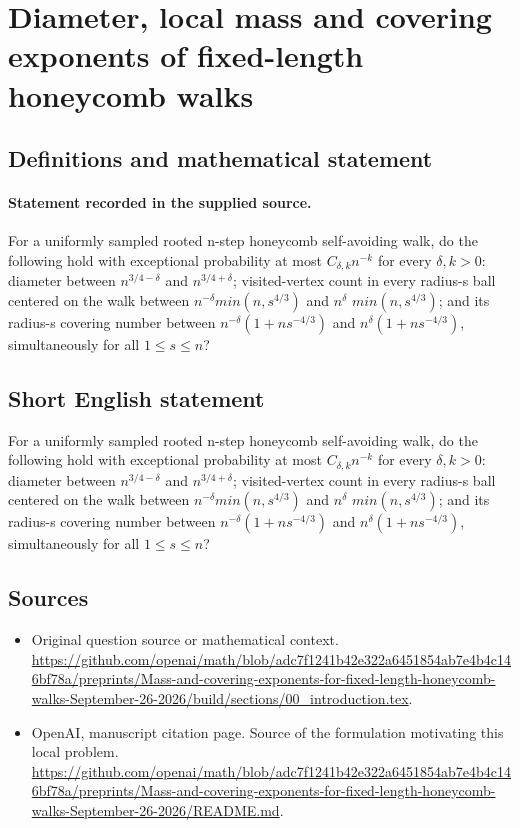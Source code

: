 \documentclass[11pt]{article}
\begin{document}
\section*{Diameter, local mass and covering exponents of fixed-length honeycomb walks}\label{statement}
\subsection{Definitions and mathematical statement}
\paragraph{Statement recorded in the supplied source.}
For a uniformly sampled rooted n-step honeycomb self-avoiding walk, do the following hold with exceptional probability at most $C_{\delta ,k}n^{-k}$ for every $\delta ,k>0:$ diameter between $n^{3/4-\delta }$ and $n^{3/4+\delta }$; visited-vertex count in every radius-s ball centered on the walk between $n^{-\delta }min(n,s^{4/3})$ and $n^\delta $ $min(n,s^{4/3})$; and its radius-s covering number between $n^{-\delta }(1+ns^{-4/3})$ and $n^\delta (1+ns^{-4/3})$, simultaneously for all $1\leq s\leq n$?
\subsection{Short English statement}
For a uniformly sampled rooted n-step honeycomb self-avoiding walk, do the following hold with exceptional probability at most $C_{\delta ,k}n^{-k}$ for every $\delta ,k>0:$ diameter between $n^{3/4-\delta }$ and $n^{3/4+\delta }$; visited-vertex count in every radius-s ball centered on the walk between $n^{-\delta }min(n,s^{4/3})$ and $n^\delta $ $min(n,s^{4/3})$; and its radius-s covering number between $n^{-\delta }(1+ns^{-4/3})$ and $n^\delta (1+ns^{-4/3})$, simultaneously for all $1\leq s\leq n$?
\subsection{Sources}
\begin{itemize}
\item[S1] Original question source or mathematical context.
\url{https://github.com/openai/math/blob/adc7f1241b42e322a6451854ab7e4b4c146bf78a/preprints/Mass-and-covering-exponents-for-fixed-length-honeycomb-walks-September-26-2026/build/sections/00_introduction.tex}.
\item[S2] OpenAI, manuscript citation page. Source of the formulation motivating this local problem.
\url{https://github.com/openai/math/blob/adc7f1241b42e322a6451854ab7e4b4c146bf78a/preprints/Mass-and-covering-exponents-for-fixed-length-honeycomb-walks-September-26-2026/README.md}.
\end{itemize}
\end{document}
